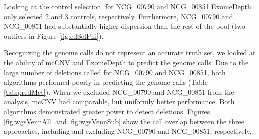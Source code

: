 \documentclass[11pt,letterpaper,oneside]{book}
\begin{document}
Looking at the control selection, for NCG\_00790 and NCG\_00851 ExomeDepth only selected 2 and 3 controls, respectively.
Furthermore, NCG\_00790 and NCG\_00851 had substantially higher dispersion than the rest of the pool (two outliers in Figure \ref{fig:edSelPhi}).

Recognizing the genome calls do not represent an accurate truth set, we looked at the ability of mcCNV and ExomeDepth to predict the genome calls.
Due to the large number of deletions called for NCG\_00790 and NCG\_00851, both algorithms performed poorly in predicting the genome calls (Table \ref{tab:predMet}).
When we excluded NCG\_00790 and NCG\_00851 from the analysis, mcCNV had comparable, but uniformly better performance.
Both algorithms demonstrated greater power to detect deletions.
Figures \ref{fig:wgsVennAll} and \ref{fig:wgsVennSub} show the call overlap between the three approaches, including and excluding NCG\_00790 and NCG\_00851, respectively.
\end{document}
